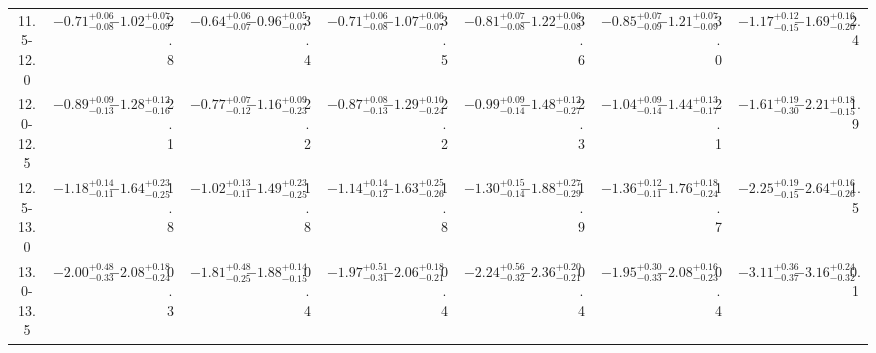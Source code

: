 \begin{tabular}{ccccccccccccccccccc}
11.5-12.0 & $-0.71_{-0.08}^{+0.06}$ & $-1.02_{-0.09}^{+0.07}$ & 2.8 & $-0.64_{-0.07}^{+0.06}$ & $-0.96_{-0.07}^{+0.05}$ & 3.4 & $-0.71_{-0.08}^{+0.06}$ & $-1.07_{-0.07}^{+0.06}$ & 3.5 & $-0.81_{-0.08}^{+0.07}$ & $-1.22_{-0.08}^{+0.06}$ & 3.6 & $-0.85_{-0.09}^{+0.07}$ & $-1.21_{-0.09}^{+0.07}$ & 3.0 & $-1.17_{-0.15}^{+0.12}$ & $-1.69_{-0.20}^{+0.16}$ & 2.4\\
12.0-12.5 & $-0.89_{-0.13}^{+0.09}$ & $-1.28_{-0.16}^{+0.12}$ & 2.1 & $-0.77_{-0.12}^{+0.07}$ & $-1.16_{-0.23}^{+0.09}$ & 2.2 & $-0.87_{-0.13}^{+0.08}$ & $-1.29_{-0.24}^{+0.10}$ & 2.2 & $-0.99_{-0.14}^{+0.09}$ & $-1.48_{-0.27}^{+0.12}$ & 2.3 & $-1.04_{-0.14}^{+0.09}$ & $-1.44_{-0.17}^{+0.13}$ & 2.1 & $-1.61_{-0.30}^{+0.19}$ & $-2.21_{-0.15}^{+0.18}$ & 1.9\\
12.5-13.0 & $-1.18_{-0.11}^{+0.14}$ & $-1.64_{-0.25}^{+0.23}$ & 1.8 & $-1.02_{-0.11}^{+0.13}$ & $-1.49_{-0.25}^{+0.23}$ & 1.8 & $-1.14_{-0.12}^{+0.14}$ & $-1.63_{-0.26}^{+0.25}$ & 1.8 & $-1.30_{-0.14}^{+0.15}$ & $-1.88_{-0.29}^{+0.27}$ & 1.9 & $-1.36_{-0.11}^{+0.12}$ & $-1.76_{-0.24}^{+0.18}$ & 1.7 & $-2.25_{-0.15}^{+0.19}$ & $-2.64_{-0.26}^{+0.16}$ & 1.5\\
13.0-13.5 & $-2.00_{-0.33}^{+0.48}$ & $-2.08_{-0.24}^{+0.18}$ & 0.3 & $-1.81_{-0.25}^{+0.48}$ & $-1.88_{-0.15}^{+0.14}$ & 0.4 & $-1.97_{-0.31}^{+0.51}$ & $-2.06_{-0.21}^{+0.18}$ & 0.4 & $-2.24_{-0.32}^{+0.56}$ & $-2.36_{-0.21}^{+0.20}$ & 0.4 & $-1.95_{-0.33}^{+0.30}$ & $-2.08_{-0.23}^{+0.16}$ & 0.4 & $-3.11_{-0.37}^{+0.36}$ & $-3.16_{-0.32}^{+0.24}$ & 0.1\\
\hline
\end{tabular}
